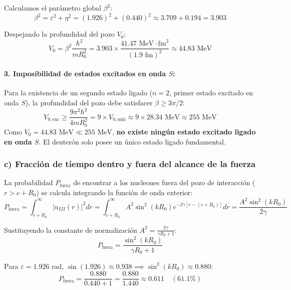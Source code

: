 \begin{problema}
Calculamos el parámetro global $\beta^2$:
\begin{equation}
\beta^2 = \varepsilon^2 + \eta^2 = (1.926)^2 + (0.440)^2 \approx 3.709 + 0.194 = 3.903
\end{equation}

Despejando la profundidad del pozo $V_0$:
\begin{equation}
V_0 = \beta^2 \frac{\hbar^2}{m R_0^2} = 3.903 \times \frac{41.47\text{ MeV}\cdot\text{fm}^2}{(1.9\text{ fm})^2} \approx 44.83\text{ MeV}
\end{equation}

\paragraph{3. Imposibilidad de estados excitados en onda $S$:}
Para la existencia de un segundo estado ligado ($n=2$, primer estado excitado en onda $S$), la profundidad del pozo debe satisfacer $\beta \ge 3\pi / 2$:
\begin{equation}
V_{0,\text{exc}} \ge \frac{9 \pi^2 \hbar^2}{4 m R_0^2} = 9 \times V_{0,\text{mín}} \approx 9 \times 28.34\text{ MeV} \approx 255\text{ MeV}
\end{equation}
Como $V_0 = 44.83\text{ MeV} \ll 255\text{ MeV}$, \textbf{no existe ningún estado excitado ligado en onda $S$}. El deuterón solo posee un único estado ligado fundamental.

\subsubsection*{c) Fracción de tiempo dentro y fuera del alcance de la fuerza}

La probabilidad $P_{\text{fuera}}$ de encontrar a los nucleones fuera del pozo de interacción ($r > c + R_0$) se calcula integrando la función de onda exterior:
\begin{equation}
P_{\text{fuera}} = \int_{c+R_0}^\infty |u_{III}(r)|^2 dr = \int_{c+R_0}^\infty A^2 \sin^2(k R_0) e^{-2\gamma \left[ r - (c + R_0) \right]} dr = \frac{A^2 \sin^2(k R_0)}{2\gamma}
\end{equation}

Sustituyendo la constante de normalización $A^2 = \frac{2\gamma}{\gamma R_0 + 1}$:
\begin{equation}
P_{\text{fuera}} = \frac{\sin^2(k R_0)}{\gamma R_0 + 1}
\end{equation}

Para $\varepsilon = 1.926\text{ rad}$, $\sin(1.926) \approx 0.938 \implies \sin^2(k R_0) \approx 0.880$:
\begin{equation}
P_{\text{fuera}} = \frac{0.880}{0.440 + 1} = \frac{0.880}{1.440} \approx 0.611 \quad (61.1\%)
\end{equation}


\end{problema}
